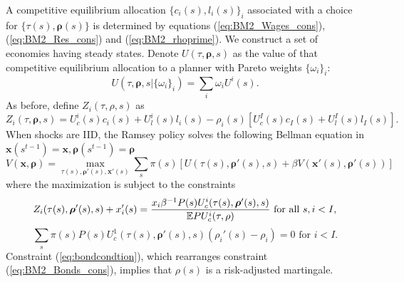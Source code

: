 \documentclass[thmsb,11pt]{article}
\begin{document}
A competitive equilibrium  allocation $\{c_i(s),l_i(s)\}_{i}$ associated with a choice for $\{\tau(s), \bm{\rho}(s)\}$ is determined by
equations (\ref{eq:BM2_Wages_cons}), (\ref{eq:BM2_Res_cons}) and (\ref{eq:BM2_rhoprime}).
We construct a  set of economies having steady states.
Denote $U(\tau,\bm{\rho},s)$ as
the value of that competitive equilibrium allocation to a planner with Pareto weights $\{\omega_i\}_i$:
\[U(\tau,\bm{\rho},s|\{\omega_i\}_i)=\sum_{i}\omega_i U^i(s).\]
As before, define $Z_i(\tau,\rho,s)$ as
\[Z_i(\tau,\bm \rho,s)=U^i_c(s)c_i(s)+U^i_l(s)l_i(s)-\rho_i(s)\left[U^I_c(s)c_I(s)+U^I_l(s)l_I(s)\right].\]
%
%
%
%
%
When shocks are IID,  the Ramsey  policy  solves the following Bellman equation in $\bm{x}(s^{t-1})=\bm{x},\bm{\rho}(s^{t-1})=\bm{\rho}$
%
 \begin{equation}
 \label{eq:ss-obj}
 	V(\bm x,\bm \rho) = \max_{\tau(s),\bm \rho'(s),\bm x'(s)}\sum_s \pi(s)\left[ U(\tau(s),\bm \rho'(s),s) + \beta V(\bm x'(s),\bm \rho'(s))\right]
 \end{equation}
where the maximization is subject to the constraints
 \begin{equation}
 \label{eq:ss-imp}
 	Z_i(\tau(s),\bm \rho'(s),s) + x'_i(s) = \frac{x_i \beta^{-1}P(s) U^i_c(\tau(s),\bm \rho'(s),s)}{\mathbb{E} P U^i_c(\tau,\rho)}\text{   for all  $s,i < I$,}\\
 \end{equation}
\begin{equation}
\label{eq:bondcondtion}
 	\sum_s \pi(s)P(s)U^1_c(\tau(s),\bm \rho'(s),s)(\rho_i'(s)-\rho_i) = 0 \text{  for $i < I.$}
\end{equation}
 Constraint (\ref{eq:bondcondtion}), which rearranges constraint (\ref{eq:BM2_Bonds_cons}),  implies that $\rho(s)$ is a risk-adjusted martingale.
\end{document}
